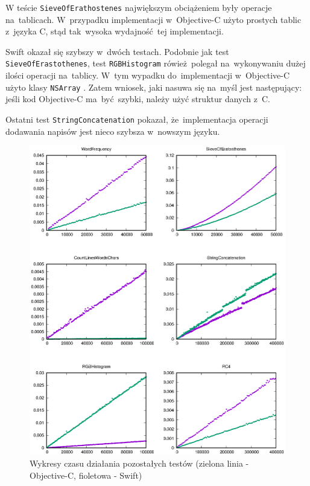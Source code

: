 \documentclass[mgr, shortabstract]{iithesis}
\newcommand{\objcinline}[1]{
    \texttt{#1}
}
\begin{document}
W teście \texttt{SieveOfErathostenes} największym obciążeniem były operacje na~tablicach. W~przypadku implementacji w~Objective-C użyto prostych tablic z~języka C, stąd tak~wysoka wydajność tej implementacji.

Swift okazał się szybszy w~dwóch testach. Podobnie jak test \texttt{SieveOfErastothenes}, test \texttt{RGBHistogram} rówież polegał na~wykonywaniu dużej ilości operacji na~tablicy. W~tym wypadku do~implementacji w~Objective-C użyto klasy \objcinline{NSArray}. Zatem wniosek, jaki nasuwa się na~myśl jest następujący: jeśli kod Objective-C ma~być szybki, należy użyć struktur danych z~C.

Ostatni test \texttt{StringConcatenation} pokazał, że~implementacja operacji dodawania napisów jest nieco szybsza w~nowszym języku.

\begin{figure}
    \includegraphics{plots/otherTests}
    \caption{Wykresy czasu działania pozostałych testów (zielona linia - Objective-C, fioletowa - Swift)}
    \label{p:other}
\end{figure}
\end{document}
